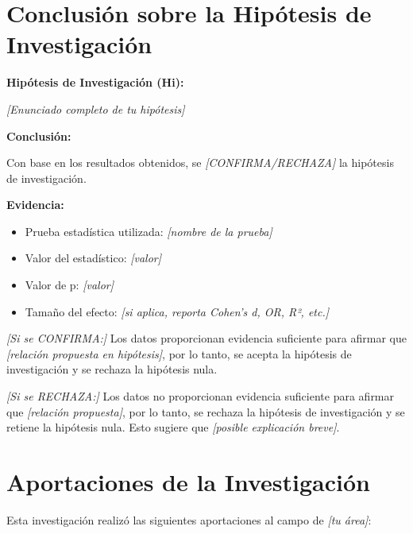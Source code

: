 \section{Conclusión sobre la Hipótesis de Investigación}
\label{sec:conclusion_hipotesis}

\textbf{Hipótesis de Investigación (Hi):}

\textit{[Enunciado completo de tu hipótesis]}

\textbf{Conclusión:}

Con base en los resultados obtenidos, se \textit{[CONFIRMA/RECHAZA]} la hipótesis de investigación. 

\textbf{Evidencia:}

\begin{itemize}
    \item Prueba estadística utilizada: \textit{[nombre de la prueba]}
    \item Valor del estadístico: \textit{[valor]}
    \item Valor de p: \textit{[valor]}
    \item Tamaño del efecto: \textit{[si aplica, reporta Cohen's d, OR, R², etc.]}
\end{itemize}

\textit{[Si se CONFIRMA:]}
Los datos proporcionan evidencia suficiente para afirmar que \textit{[relación propuesta en hipótesis]}, por lo tanto, se acepta la hipótesis de investigación y se rechaza la hipótesis nula.

\textit{[Si se RECHAZA:]}
Los datos no proporcionan evidencia suficiente para afirmar que \textit{[relación propuesta]}, por lo tanto, se rechaza la hipótesis de investigación y se retiene la hipótesis nula. Esto sugiere que \textit{[posible explicación breve]}.

\section{Aportaciones de la Investigación}
\label{sec:aportaciones}

Esta investigación realizó las siguientes aportaciones al campo de \textit{[tu área]}:

